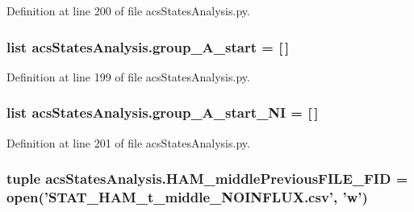 Definition at line 200 of file acs\-States\-Analysis.\-py.

\hypertarget{a00099_a3898175300d001a17a60c23656d2812f}{
\subsubsection[{group\-\_\-\-A\-\_\-start}]{\setlength{\rightskip}{0pt plus 5cm}list acs\-States\-Analysis.\-group\-\_\-\-A\-\_\-start = \mbox{[}$\,$\mbox{]}}}\label{a00099_a3898175300d001a17a60c23656d2812f}


Definition at line 199 of file acs\-States\-Analysis.\-py.

\hypertarget{a00099_aedb746884c5ae6e301c8ad2d8307fe4d}{
\subsubsection[{group\-\_\-\-A\-\_\-start\-\_\-\-N\-I}]{\setlength{\rightskip}{0pt plus 5cm}list acs\-States\-Analysis.\-group\-\_\-\-A\-\_\-start\-\_\-\-N\-I = \mbox{[}$\,$\mbox{]}}}\label{a00099_aedb746884c5ae6e301c8ad2d8307fe4d}


Definition at line 201 of file acs\-States\-Analysis.\-py.

\hypertarget{a00099_aaf0dd6e74d88a7cf2e909301b422c17d}{
\subsubsection[{H\-A\-M\-\_\-middle\-Previous\-F\-I\-L\-E\-\_\-\-F\-I\-D}]{\setlength{\rightskip}{0pt plus 5cm}tuple acs\-States\-Analysis.\-H\-A\-M\-\_\-middle\-Previous\-F\-I\-L\-E\-\_\-\-F\-I\-D = open('S\-T\-A\-T\-\_\-\-H\-A\-M\-\_\-t\-\_\-middle\-\_\-\-N\-O\-I\-N\-F\-L\-U\-X.\-csv', 'w')}}\label{a00099_aaf0dd6e74d88a7cf2e909301b422c17d}


